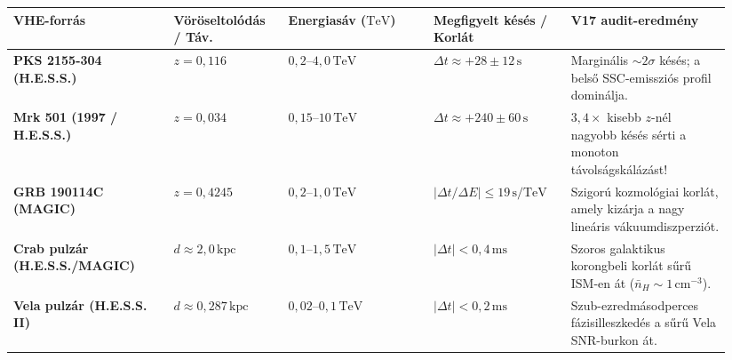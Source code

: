 \documentclass[10pt,a4paper]{article}
\begin{document}
\begin{center}\vspace{-2pt}
{\footnotesize
\begin{tabular}{@{}>{\bfseries}p{0.21\linewidth}p{0.15\linewidth}p{0.19\linewidth}p{0.18\linewidth}p{0.21\linewidth}@{}}
\toprule
VHE-forr\'as & V\"or\"oseltol\'od\'as / T\'av. & Energias\'av ($\text{TeV}$) & Megfigyelt k\'es\'es / Korl\'at & V17 audit-eredm\'eny \\
\midrule
PKS 2155-304 (H.E.S.S.) & $z = 0{,}116$ & $0{,}2\text{--}4{,}0\,\text{TeV}$ & $\Delta t \approx +28 \pm 12\,\text{s}$ & Margin\'alis $\sim 2\sigma$ k\'es\'es; a bels\H{o} SSC-emisszi\'os profil domin\'alja. \\
Mrk 501 (1997 / H.E.S.S.) & $z = 0{,}034$ & $0{,}15\text{--}10\,\text{TeV}$ & $\Delta t \approx +240 \pm 60\,\text{s}$ & $3{,}4\times$ kisebb $z$-n\'el nagyobb k\'es\'es s\'erti a monoton t\'avols\'agsk\'al\'az\'ast! \\
GRB 190114C (MAGIC) & $z = 0{,}4245$ & $0{,}2\text{--}1{,}0\,\text{TeV}$ & $|\Delta t / \Delta E| \le 19\,\text{s/TeV}$ & Szigor\'u kozmol\'ogiai korl\'at, amely kiz\'arja a nagy line\'aris v\'akuumdiszperzi\'ot. \\
Crab pulz\'ar (H.E.S.S./MAGIC) & $d \approx 2{,}0\,\text{kpc}$ & $0{,}1\text{--}1{,}5\,\text{TeV}$ & $|\Delta t| < 0{,}4\,\text{ms}$ & Szoros galaktikus korongbeli korl\'at s\H{u}r\H{u} ISM-en \'at ($\bar{n}_H \sim 1\,\text{cm}^{-3}$). \\
Vela pulz\'ar (H.E.S.S. II) & $d \approx 0{,}287\,\text{kpc}$ & $0{,}02\text{--}0{,}1\,\text{TeV}$ & $|\Delta t| < 0{,}2\,\text{ms}$ & Szub-ezredm\'asodperces f\'azisilleszked\'es a s\H{u}r\H{u} Vela SNR-burkon \'at. \\
\bottomrule
\end{tabular}}
\end{center}
\end{document}
